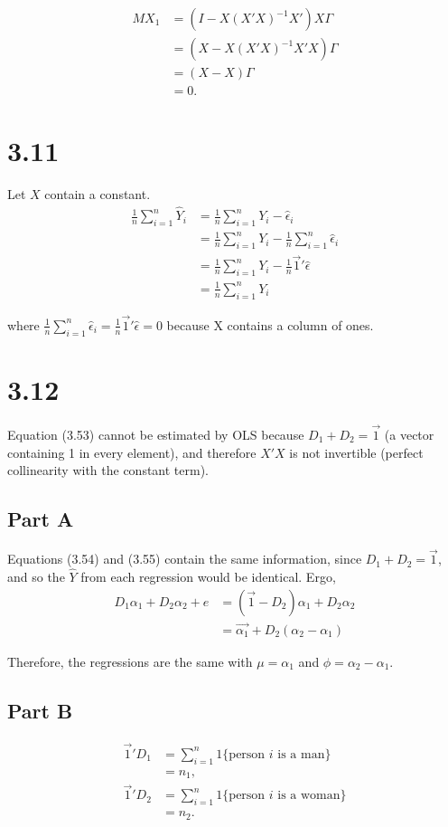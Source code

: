 \documentclass[11pt]{article} %
\begin{document}
\begin{align*}
MX_1 &= (I - X(X'X)^{-1}X')X\Gamma\\
&= (X - X(X'X)^{-1}X'X)\Gamma\\
&= (X-X)\Gamma\\
&= 0.
\end{align*}

\section{3.11}
Let $X$ contain a constant.
\begin{align*}
\frac{1}{n}\sum_{i=1}^n \hat{Y}_i &= \frac{1}{n}\sum_{i=1}^n Y_i - \hat{\epsilon}_i\\
&= \frac{1}{n}\sum_{i=1}^n Y_i  - \frac{1}{n}\sum_{i=1}^n \hat{\epsilon}_i \\
&= \frac{1}{n}\sum_{i=1}^n Y_i -\frac{1}{n}\vec{1}'\hat{\epsilon}\\
&=  \frac{1}{n}\sum_{i=1}^n Y_i
\end{align*}

where $\frac{1}{n}\sum_{i=1}^n \hat{\epsilon}_i  = \frac{1}{n}\vec{1}'\hat{\epsilon}  = 0$ because X contains a column of ones.

\section{3.12}
Equation (3.53) cannot be estimated by OLS because $D_1 + D_2 = \vec{1}$ (a vector containing 1 in every element), and therefore $X'X$ is not invertible (perfect collinearity with the constant term).
\subsection{Part A}
Equations (3.54) and (3.55) contain the same information, since  $D_1 + D_2 = \vec{1}$, and so the $\hat{Y}$ from each regression would be identical. Ergo,
\begin{align*}
D_1\alpha_1 + D_2 \alpha_2 + e &= (\vec{1} - D_2)\alpha_1 + D_2 \alpha_2\\
&= \vec{\alpha_1 } +D_2(\alpha_2 - \alpha_1)
\end{align*}

Therefore, the regressions are the same with $\mu = \alpha_1$ and $\phi = \alpha_2 - \alpha_1.$
\subsection{Part B}
\begin{align*}
\vec{1}'D_1 &= \sum_{i=1}^n 1\{ \text{person $i$ is a man}\}\\
&=n_1, \\
\vec{1}'D_2 &= \sum_{i=1}^n 1\{ \text{person $i$ is a woman}\}\\
&=n_2.
\end{align*}
\end{document}
